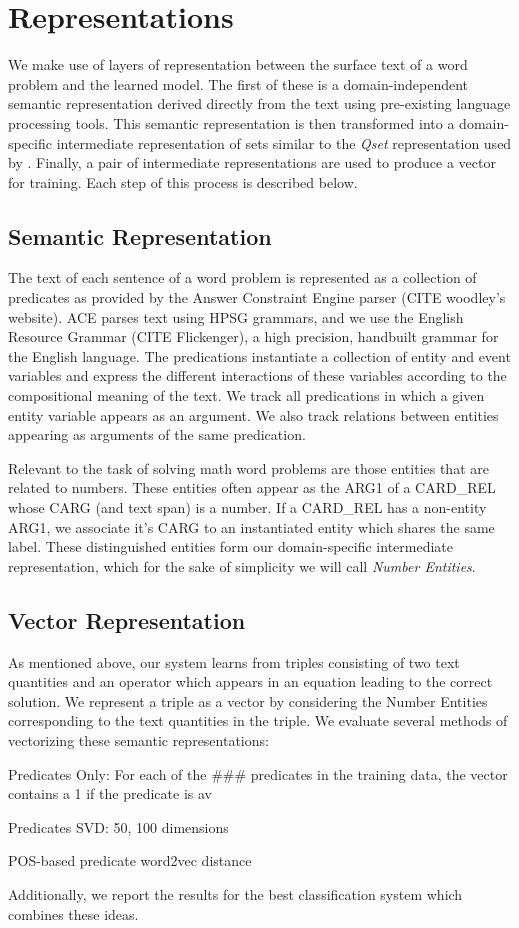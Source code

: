 \section{Representations}
We make use of layers of representation between the surface text of a word problem and the learned model. 
The first of these is a domain-independent semantic representation derived directly from the text using pre-existing language processing tools.
This semantic representation is then transformed into a domain-specific intermediate representation of sets similar to the {\it Qset} representation used by \cite{konked2015}. 
Finally, a pair of intermediate representations are used to produce a vector for training. 
Each step of this process is described below.

\subsection{Semantic Representation}
\label{semantics}
The text of each sentence of a word problem is represented as a collection of predicates as provided by the Answer Constraint Engine parser (CITE woodley's website).
ACE parses text using HPSG grammars, and we use the English Resource Grammar (CITE Flickenger), a high precision, handbuilt grammar for the English language. 
The predications instantiate a collection of entity and event variables and express the different interactions of these variables according to the compositional meaning of the text. 
We track all predications in which a given entity variable appears as an argument.
We also track relations between entities appearing as arguments of the same predication.

Relevant to the task of solving math word problems are those entities that are related to numbers.
These entities often appear as the ARG1 of a CARD_REL whose CARG (and text span) is a number. 
If a CARD_REL has a non-entity ARG1, we associate it's CARG to an instantiated entity which shares the same label. 
These distinguished entities form our domain-specific intermediate representation, which for the sake of simplicity we will call {\it Number Entities}.

\subsection{Vector Representation}
\label{vectors}
As mentioned above, our system learns from triples consisting of two text quantities and an operator which appears in an equation leading to the correct solution. 
We represent a triple as a vector by considering the Number Entities corresponding to the text quantities in the triple. 
We evaluate several methods of vectorizing these semantic representations:
\begin{compactenum}
\item Predicates Only: For each of the ### predicates in the training data, the vector contains a 1 if the predicate is av
\item Predicates SVD: 50, 100 dimensions
\item POS-based predicate word2vec distance 
\end{compactenum}
Additionally, we report the results for the best classification system which combines these ideas. 


